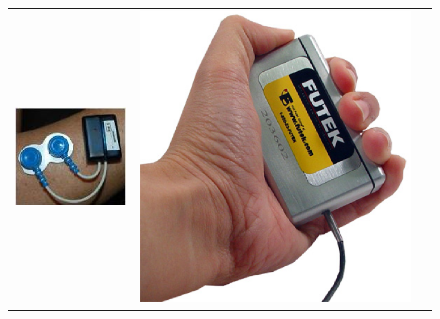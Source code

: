 \documentclass{article}
\begin{document}

\begin{figure}[!ht] \centering
  \begin{tabular}{ccc}
    \includegraphics[height=0.16\textheight]{Electrode.eps} &
    \includegraphics[height=0.16\textheight]{Hand_Gripper.eps} &

\end{tabular}
\end{figure}
\end{document}
